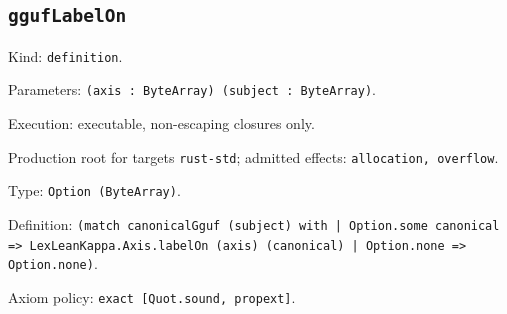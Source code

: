 \documentclass[11pt]{article}
\begin{document}
\subsection*{\texttt{ggufLabelOn}}
\noindent Kind: \texttt{definition}.\par
\noindent Parameters: \texttt{(axis : ByteArray) (subject : ByteArray)}.\par
\noindent Execution: executable, non-escaping closures only.\par
\noindent Production root for targets \texttt{rust-std}; admitted effects: \texttt{allocation, overflow}.\par
\noindent Type: \texttt{Option (ByteArray)}.\par
\noindent Definition: \texttt{(match canonicalGguf (subject) with | Option.some canonical => LexLeanKappa.Axis.labelOn (axis) (canonical) | Option.none => Option.none)}.\par
\noindent Axiom policy: \texttt{exact [Quot.sound, propext]}.\par
\end{document}
